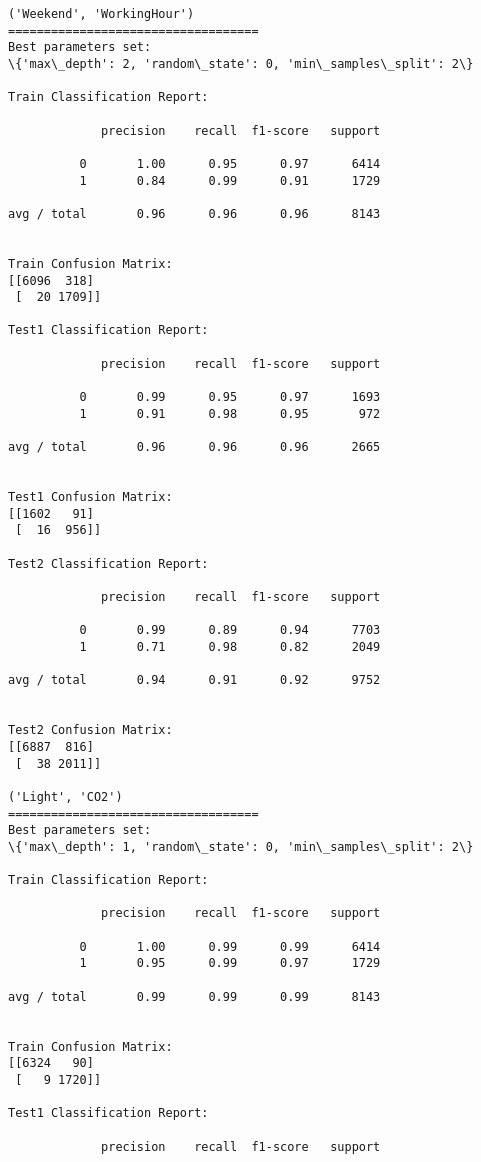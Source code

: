 \documentclass[11pt]{article}
\begin{document}
    \begin{Verbatim}[commandchars=\\\{\}]
('Weekend', 'WorkingHour')
===================================
Best parameters set:
\{'max\_depth': 2, 'random\_state': 0, 'min\_samples\_split': 2\}

Train Classification Report:

             precision    recall  f1-score   support

          0       1.00      0.95      0.97      6414
          1       0.84      0.99      0.91      1729

avg / total       0.96      0.96      0.96      8143


Train Confusion Matrix:
[[6096  318]
 [  20 1709]]

Test1 Classification Report:

             precision    recall  f1-score   support

          0       0.99      0.95      0.97      1693
          1       0.91      0.98      0.95       972

avg / total       0.96      0.96      0.96      2665


Test1 Confusion Matrix:
[[1602   91]
 [  16  956]]

Test2 Classification Report:

             precision    recall  f1-score   support

          0       0.99      0.89      0.94      7703
          1       0.71      0.98      0.82      2049

avg / total       0.94      0.91      0.92      9752


Test2 Confusion Matrix:
[[6887  816]
 [  38 2011]]

('Light', 'CO2')
===================================
Best parameters set:
\{'max\_depth': 1, 'random\_state': 0, 'min\_samples\_split': 2\}

Train Classification Report:

             precision    recall  f1-score   support

          0       1.00      0.99      0.99      6414
          1       0.95      0.99      0.97      1729

avg / total       0.99      0.99      0.99      8143


Train Confusion Matrix:
[[6324   90]
 [   9 1720]]

Test1 Classification Report:

             precision    recall  f1-score   support


\end{Verbatim}
\end{document}
